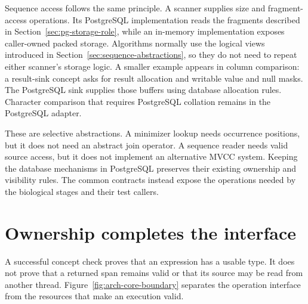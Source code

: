 Sequence access follows the same principle. A scanner supplies size and
fragment-access operations. Its PostgreSQL implementation reads the fragments
described in Section~\ref{sec:pg-storage-role}, while an in-memory
implementation exposes caller-owned packed
storage. Algorithms normally use the logical views introduced in
Section~\ref{sec:sequence-abstractions}, so they do not need to repeat either
scanner's storage logic. A smaller example appears in column comparison:
a result-sink concept asks for result allocation and writable value and null
masks. The PostgreSQL sink supplies those buffers using database allocation
rules. Character comparison that requires PostgreSQL collation remains in
the PostgreSQL adapter.

These are selective abstractions. A minimizer lookup needs occurrence
positions, but it does not need an abstract join operator. A sequence reader
needs valid source access, but it does not implement an alternative MVCC
system. Keeping the database mechanisms in PostgreSQL preserves their
existing ownership and visibility rules. The common contracts instead expose
the operations needed by the biological stages and their test callers.

\section{Ownership completes the interface}
\label{sec:arch-ownership-boundary}

A successful concept check proves that an expression has a usable type.
It does not prove that a returned span remains valid or that its source may
be read from another thread. Figure~\ref{fig:arch-core-boundary} separates the
operation interface from the resources that make an execution valid.

